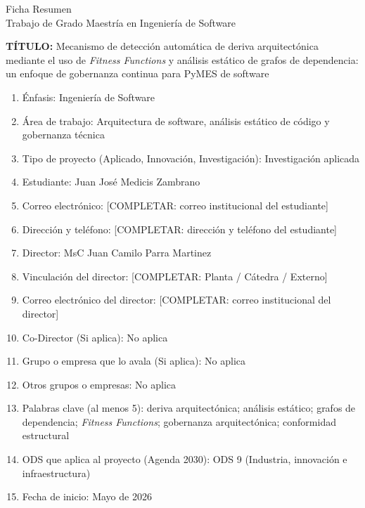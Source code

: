 \thispagestyle{empty}
\begin{center}
    \Large{Ficha Resumen \\ Trabajo de Grado Maestría en Ingeniería de Software}
\end{center}

\textbf{TÍTULO:} Mecanismo de detección automática de deriva arquitectónica mediante el uso de \textit{Fitness Functions} y análisis estático de grafos de dependencia: un enfoque de gobernanza continua para PyMES de software
\begin{enumerate}
    \item Énfasis: Ingeniería de Software
    \item Área de trabajo: Arquitectura de software, análisis estático de código y gobernanza técnica
    \item Tipo de proyecto (Aplicado, Innovación, Investigación): Investigación aplicada
    \item Estudiante: Juan José Medicis Zambrano
    \item Correo electrónico: [COMPLETAR: correo institucional del estudiante]
    \item Dirección y teléfono: [COMPLETAR: dirección y teléfono del estudiante]
    \item Director: MsC Juan Camilo Parra Martinez
    \item Vinculación del director: [COMPLETAR: Planta / Cátedra / Externo]
    \item Correo electrónico del director: [COMPLETAR: correo institucional del director]
    \item Co-Director (Si aplica): No aplica
    \item Grupo o empresa que lo avala (Si aplica): No aplica
    \item Otros grupos o empresas: No aplica
    \item Palabras clave (al menos 5): deriva arquitectónica; análisis estático; grafos de dependencia; \textit{Fitness Functions}; gobernanza arquitectónica; conformidad estructural
    \item ODS que aplica al proyecto (Agenda 2030): ODS 9 (Industria, innovación e infraestructura)
    \item Fecha de inicio: Mayo de 2026

\end{enumerate}
